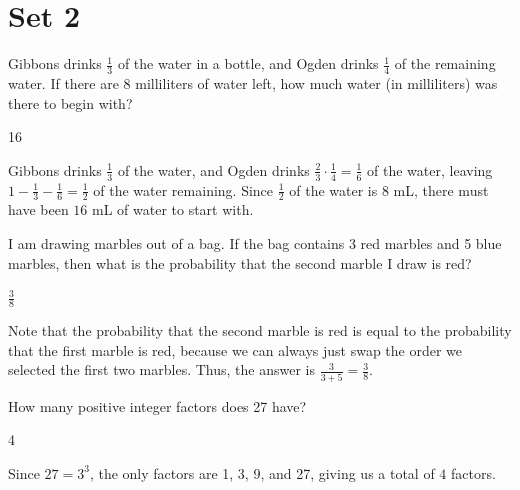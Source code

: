 \documentclass[11pt]{article}
\begin{document}
\newpage
\section*{Set 2}
\begin{problem}
Gibbons drinks $\frac{1}{3}$ of the water in a bottle, and Ogden drinks $\frac{1}{4}$ of the remaining water. If there are 8 milliliters of water left, how much water (in milliliters) was there to begin with?
\end{problem}

\begin{answer}
16
\end{answer}

\begin{solution}
Gibbons drinks $\frac{1}{3}$ of the water, and Ogden drinks $\frac{2}{3} \cdot \frac{1}{4} = \frac{1}{6}$ of the water, leaving $1-\frac{1}{3} - \frac{1}{6} = \frac{1}{2}$ of the water remaining. Since $\frac{1}{2}$ of the water is 8 mL, there must have been $\boxed{16}$ mL of water to start with.
\end{solution}


\begin{problem}
I am drawing marbles out of a bag. If the bag contains 3 red marbles and 5 blue marbles, then what is the probability that the second marble I draw is red?
\end{problem}

\begin{answer}
$\frac{3}{8}$
\end{answer}

\begin{solution}
Note that the probability that the second marble is red is equal to the probability that the first marble is red, because we can always just swap the order we selected the first two marbles. Thus, the answer is $\frac{3}{3+5} = \boxed{\frac{3}{8}}$.
\end{solution}


\begin{problem}
How many positive integer factors does 27 have? 
\end{problem}

\begin{answer}
4
\end{answer}

\begin{solution}
Since $27 = 3^3$, the only factors are 1, 3, 9, and 27, giving us a total of $\boxed{4}$ factors.
\end{solution}
\end{document}
